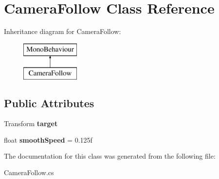 \hypertarget{class_camera_follow}{}\section{Camera\+Follow Class Reference}
\label{class_camera_follow}
Inheritance diagram for Camera\+Follow\+:\begin{figure}[H]
\begin{center}
\leavevmode
\includegraphics[height=2.000000cm]{class_camera_follow}
\end{center}
\end{figure}
\subsection*{Public Attributes}
\begin{DoxyCompactItemize}
\item 
\mbox{\label{class_camera_follow_a2ef2d3655fd0cb86d18e6324b75c0a59}} 
Transform {\bfseries target}
\item 
\mbox{\label{class_camera_follow_a924c2f26a261004c89aa63ca0c89d454}} 
float {\bfseries smooth\+Speed} = 0.\+125f
\end{DoxyCompactItemize}


The documentation for this class was generated from the following file\+:\begin{DoxyCompactItemize}
\item 
Camera\+Follow.\+cs\end{DoxyCompactItemize}
